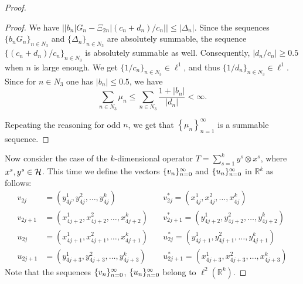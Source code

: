 \begin{proof}
\begin{proof}
        We have $\big\lvert \lvert b_n \rvert G_n - \Xi_{2n}\lvert (c_n + d_n)/c_n \rvert\big\rvert \leq \lvert \Delta_n \rvert$.
        Since the sequences $\{b_n G_n\}_{n\in N_3}$ and $\{\Delta_n\}_{n \in N_3}$ are absolutely summable, the sequence
          $\{(c_n + d_n) / c_n\}_{n\in N_3} $ is absolutely summable as well.
        Consequently, $\lvert d_n/c_n \rvert \geq 0.5$ when $n$ is large enough.
        We get $\{1/c_n\}_{n \in N_3} \in \ell^1$, and thus $\{1/d_n\}_{n \in N_3} \in \ell^1$.
        Since for $n \in N_3$ one has $\lvert b_n \rvert \leq 0.5$, we have
        \[
          \sum_{n\in N_3} \mu_n \leq \sum_{n \in N_3} \frac{1 + \lvert b_n\rvert}{\lvert d_n \rvert} < \infty.
        \]

        Repeating the reasoning for odd $n$, we get that $\left\{\mu_n\right\}_{n=1}^\infty$ is a summable sequence.
      \end{proof}
      \bigskip
      Now consider the case of the $k$-dimensional operator $T = \sum_{s=1}^k y^s \otimes x^s$, where $x^s, y^s \in \cal{H}$.
      This time we define the vectors $\seq{v}$ and $\seq{u}$ in $\mathbb{R}^k$ as follows:
      \begin{align*}
        v_{2j} &= (y^1_{4j}, y^2_{4j}, \dots ,y^k_{4j}) \quad
        &v^*_{2j} = (x^1_{4j}, x^2_{4j}, \dots ,x^k_{4j}) \\
        v_{2j+1} &= (x^1_{4j+2}, x^2_{4j+2}, \dots ,x^k_{4j+2}) \quad
        &v^*_{2j+1} = (y^1_{4j+2}, y^2_{4j+2}, \dots ,y^k_{4j+2}) \\
        u_{2j} &= (x^1_{4j+1}, x^2_{4j+1}, \dots ,x^k_{4j+1}) \quad
        &u^*_{2j} = (y^1_{4j+1}, y^2_{4j+1}, \dots ,y^k_{4j+1}) \\
        u_{2j+1} &= (y^1_{4j+3}, y^2_{4j+3}, \dots ,y^k_{4j+3}) \quad
        &u^*_{2j+1} = (x^1_{4j+3}, x^2_{4j+3}, \dots ,x^k_{4j+3})
      \end{align*}
      Note that the sequences $\seq{v}$, $\seq{u}$ belong to $\ell^2(\mathbb{R}^k)$.


\end{proof}
